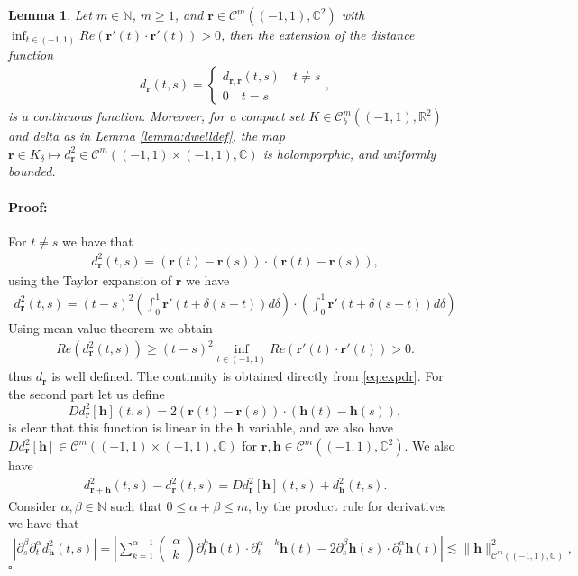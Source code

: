 \documentclass{article}
\newtheorem{lemma}[theorem]{Lemma}
\newenvironment{proof}{\paragraph{Proof:}}{\hfill$\square$}
\newcommand{\IC}{{\mathbb C}}
\newcommand{\IN}{{\mathbb N}}
\newcommand{\IR}{{\mathbb R}}
\newcommand{\cmspace}[3]{\mathcal{C}^{#1} \left( #2, #3 \right)}
\newcommand{\rgeo}[1]{\mathcal{C}_b^{#1}\left( (-1,1), \IR^2 \right)}
\newcommand{\cgeo}[1]{\mathcal{C}^{#1}\left( (-1,1), \IC^2 \right)}
\newcommand{\bh}{\bm{h}}
\newcommand{\br}{\bm{r}}
\newcommand{\iinterv}{(-1,1)\times(-1,1)}
\begin{document}
\begin{lemma}
\label{lemma:dself}
Let $m \in \IN$, $m\geq 1$, and $\br \in  \cgeo{m}$ with $\inf_{t \in (-1,1)}Re(\br'(t) \cdot \br'(t)) >0$, then the extension of the distance function 
\begin{align*}
d_{\br} (t,s) = \begin{cases} d_{\br,\br}(t,s) \quad t\neq s \\ 
0 \quad t=s \end{cases},
\end{align*} 
is a continuous function. Moreover, for a compact set $K \in \rgeo{m}$ and delta as in Lemma \ref{lemma:dwelldef}, the map $\br \in K_\delta \mapsto d_{\br}^2 \in \cmspace{m}{(-1,1)\times(-1,1)}{\IC}$ is holomporphic, and uniformly bounded.   
\end{lemma}
\begin{proof}
For $t \neq s$ we have that
\begin{align*}
d_{\br}^2(t,s) = (\br(t)-\br(s))\cdot (\br(t) -\br(s)),
\end{align*}
using the Taylor expansion of $\br$ we have 
\begin{align}
\label{eq:expdr}
d_{\br}^2(t,s) = (t-s)^2 \left(\int_{0}^1 \br'(t+\delta(s-t))d\delta \right) \cdot \left(\int_{0}^1 \br'(t+\delta(s-t))d\delta \right)
\end{align}
Using mean value theorem we obtain 
\begin{align*}
Re ( d_{\br}^2(t,s)  )  \geq (t-s)^2 \inf_{t \in (-1,1)} Re(\br'(t) \cdot \br'(t)) >0.
\end{align*}
thus $d_{\br}$ is well defined. The continuity is obtained directly from \eqref{eq:expdr}. For the second part let us define 
$$
D d_{\br}^2[\bh](t,s) = 2 (\br(t)-\br(s))\cdot (\bh(t) - \bh(s)),
$$
is clear that this function is linear in the $\bh$ variable, and we also have $D d_{\br}^2[\bh] \in \cmspace{m}{\iinterv}{\IC}$ for $\br,\bh \in \cmspace{m}{(-1,1)}{\IC^2}$. We also have 
\begin{align*}
d^2_{\br+\bh}(t,s) -d^2_{\br}(t,s) =  D d_{\br}^2[\bh](t,s) + d^2_{\bh}(t,s).
\end{align*}
Consider $\alpha, \beta \in \IN$ such that $0 \leq \alpha +\beta \leq m$, by the product rule for derivatives we have that 
\begin{align*}
 \left\vert\partial_s^\beta \partial_t^\alpha d^2_{\bh}(t,s) \right\vert= \left\vert\sum_{k=1}^{\alpha-1} \begin{pmatrix} \alpha \\ k \end{pmatrix} \partial_t^k \bh(t) \cdot \partial^{\alpha-k}_t \bh(t) - 2\partial_s^\beta \bh(s) \cdot \partial^\alpha_t \bh(t)\right\vert \lesssim \| \bh\|^2_{\cmspace{m}{(-1,1)}{\IC}},

\end{align*}
\end{proof}
\end{document}
